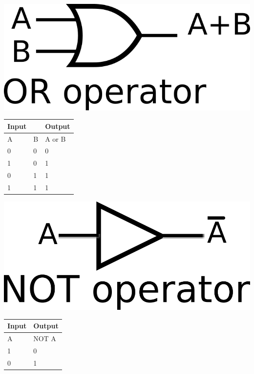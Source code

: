 \vspace{20mm}
\hspace{1in}
\begin{minipage}{.5\linewidth}
    \includegraphics[width=3 in]{images/or1.png}
\end{minipage}
\begin{minipage}{\linewidth}
\begin{tabular}{|ll|l|}
	\hline
	Input                   &   & Output  \\ \hline
    \multicolumn{1}{|l|}{A} & B & A or B \\ \hline
	\multicolumn{1}{|l|}{0} & 0 & 0       \\ \hline
	\multicolumn{1}{|l|}{1} & 0 & 1       \\ \hline
	\multicolumn{1}{|l|}{0} & 1 & 1       \\ \hline
	\multicolumn{1}{|l|}{1} & 1 & 1       \\ \hline
\end{tabular}
\end{minipage}


\vspace{20mm}
\hspace{1in}
\begin{minipage}{.5\linewidth}
    \includegraphics[width=3 in]{images/not1.png}
\end{minipage}
\begin{minipage}{\linewidth}
	\begin{tabular}{|l|l|}
		\hline
		Input & Output \\ \hline
		A     & NOT A  \\ \hline
		1 & 0     \\ \hline
		0 & 1     \\ \hline
	\end{tabular}
\end{minipage}


